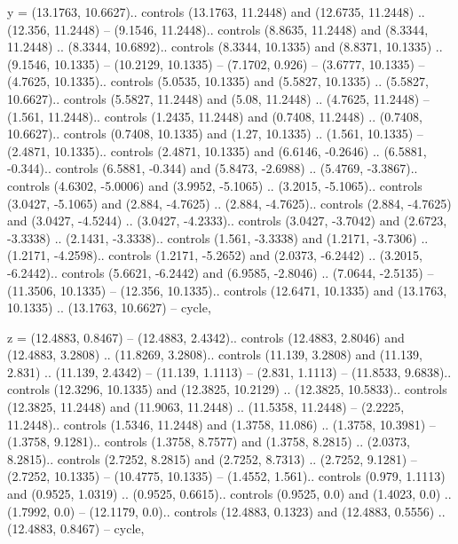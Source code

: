 y = {(13.1763, 10.6627).. controls (13.1763, 11.2448) and (12.6735, 11.2448) .. (12.356, 11.2448) -- (9.1546, 11.2448).. controls (8.8635, 11.2448) and (8.3344, 11.2448) .. (8.3344, 10.6892).. controls (8.3344, 10.1335) and (8.8371, 10.1335) .. (9.1546, 10.1335) -- (10.2129, 10.1335) -- (7.1702, 0.926) -- (3.6777, 10.1335) -- (4.7625, 10.1335).. controls (5.0535, 10.1335) and (5.5827, 10.1335) .. (5.5827, 10.6627).. controls (5.5827, 11.2448) and (5.08, 11.2448) .. (4.7625, 11.2448) -- (1.561, 11.2448).. controls (1.2435, 11.2448) and (0.7408, 11.2448) .. (0.7408, 10.6627).. controls (0.7408, 10.1335) and (1.27, 10.1335) .. (1.561, 10.1335) -- (2.4871, 10.1335).. controls (2.4871, 10.1335) and (6.6146, -0.2646) .. (6.5881, -0.344).. controls (6.5881, -0.344) and (5.8473, -2.6988) .. (5.4769, -3.3867).. controls (4.6302, -5.0006) and (3.9952, -5.1065) .. (3.2015, -5.1065).. controls (3.0427, -5.1065) and (2.884, -4.7625) .. (2.884, -4.7625).. controls (2.884, -4.7625) and (3.0427, -4.5244) .. (3.0427, -4.2333).. controls (3.0427, -3.7042) and (2.6723, -3.3338) .. (2.1431, -3.3338).. controls (1.561, -3.3338) and (1.2171, -3.7306) .. (1.2171, -4.2598).. controls (1.2171, -5.2652) and (2.0373, -6.2442) .. (3.2015, -6.2442).. controls (5.6621, -6.2442) and (6.9585, -2.8046) .. (7.0644, -2.5135) -- (11.3506, 10.1335) -- (12.356, 10.1335).. controls (12.6471, 10.1335) and (13.1763, 10.1335) .. (13.1763, 10.6627) -- cycle},

z = {(12.4883, 0.8467) -- (12.4883, 2.4342).. controls (12.4883, 2.8046) and (12.4883, 3.2808) .. (11.8269, 3.2808).. controls (11.139, 3.2808) and (11.139, 2.831) .. (11.139, 2.4342) -- (11.139, 1.1113) -- (2.831, 1.1113) -- (11.8533, 9.6838).. controls (12.3296, 10.1335) and (12.3825, 10.2129) .. (12.3825, 10.5833).. controls (12.3825, 11.2448) and (11.9063, 11.2448) .. (11.5358, 11.2448) -- (2.2225, 11.2448).. controls (1.5346, 11.2448) and (1.3758, 11.086) .. (1.3758, 10.3981) -- (1.3758, 9.1281).. controls (1.3758, 8.7577) and (1.3758, 8.2815) .. (2.0373, 8.2815).. controls (2.7252, 8.2815) and (2.7252, 8.7313) .. (2.7252, 9.1281) -- (2.7252, 10.1335) -- (10.4775, 10.1335) -- (1.4552, 1.561).. controls (0.979, 1.1113) and (0.9525, 1.0319) .. (0.9525, 0.6615).. controls (0.9525, 0.0) and (1.4023, 0.0) .. (1.7992, 0.0) -- (12.1179, 0.0).. controls (12.4883, 0.1323) and (12.4883, 0.5556) .. (12.4883, 0.8467) -- cycle},